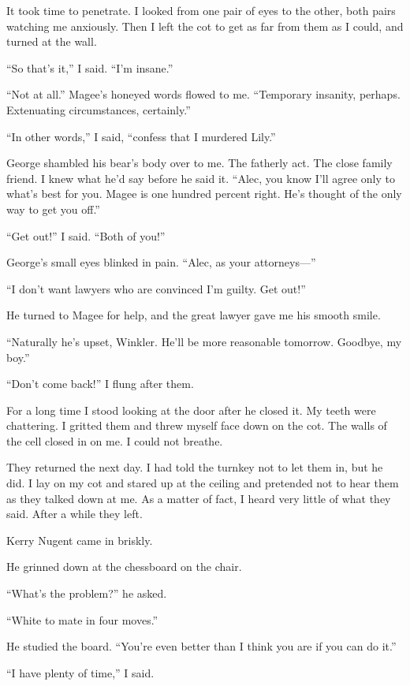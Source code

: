 \documentclass{novel}
\begin{document}
\scenestars

It took time to penetrate. I looked from one pair of eyes to the other, both pairs watching me anxiously. Then I left the cot to get as far from them as I could, and turned at the wall.

“So that’s it,” I said. “I’m insane.”

“Not at all.” Magee’s honeyed words flowed to me. “Temporary insanity, perhaps. Extenuating circumstances, certainly.”

“In other words,” I said, “confess that I murdered Lily.”

George shambled his bear’s body over to me. The fatherly act. The close family friend. I knew what he’d say before he said it. “Alec, you know I’ll agree only to what’s best for you. Magee is one hundred percent right. He’s thought of the only way to get you off.”

“Get out!” I said. “Both of you!”

George’s small eyes blinked in pain. “Alec, as your attorneys—”

“I don’t want lawyers who are convinced I’m guilty. Get out!”

He turned to Magee for help, and the great lawyer gave me his smooth smile. 

“Naturally he’s upset, Winkler. He’ll be more reasonable tomorrow. Goodbye, my boy.”

“Don’t come back!” I flung after them.

For a long time I stood looking at the door after he closed it. My teeth were chattering. I gritted them and threw myself face down on the cot. The walls of the cell closed in on me. I could not breathe.

They returned the next day. I had told the turnkey not to let them in, but he did. I lay on my cot and stared up at the ceiling and pretended not to hear them as they talked down at me. As a matter of fact, I heard very little of what they said. After a while they left.

\scenestars

Kerry Nugent came in briskly.

He grinned down at the chessboard on the chair.

“What’s the problem?” he asked.

“White to mate in four moves.”

He studied the board. “You’re even better than I think you are if you can do it.”

“I have plenty of time,” I said.
\end{document}
